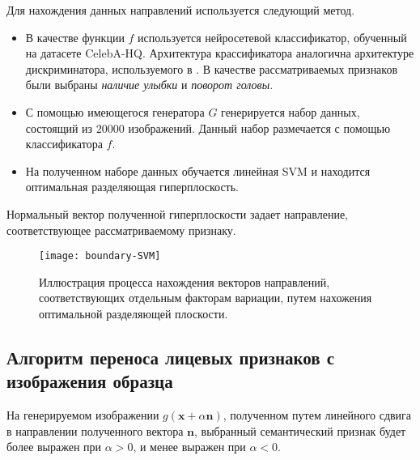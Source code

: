 Для нахождения данных направлений используется следующий метод.
\begin{itemize}
    \item В качестве функции $f$ используется нейросетевой классификатор, обученный на датасете CelebA-HQ. Архитектура крассификатора аналогична архитектуре дискриминатора, используемого в \cite{progressive-growing-gan, StyleGAN}. В качестве рассматриваемых признаков были выбраны \emph{наличие улыбки} и \emph{поворот головы}.
    \item С помощью имеющегося генератора $G$ генерируется набор данных, состоящий из $20000$ изображений. Данный набор размечается с помощью классификатора $f$.
    \item На полученном наборе данных обучается линейная SVM \cite{svm} и находится оптимальная разделяющая гиперплоскость. 
\end{itemize}
Нормальный вектор полученной гиперплоскости задает направление, соответствующее рассматриваемому признаку.

\begin{figure}[h]
\begin{center}
    \texttt{[image: boundary-SVM]}
    \caption{Иллюстрация процесса нахождения векторов направлений, соответствующих отдельным факторам вариации, путем нахожения оптимальной разделяющей плоскости.}
    \label{fig:svm-boundary}
\end{center}
\end{figure}


\subsection{Алгоритм переноса лицевых признаков с изображения образца}


На генерируемом изображении $g(\mathbf x + \alpha \mathbf n)$, полученном путем линейного сдвига в направлении полученного вектора $\mathbf n$, выбранный семантический признак будет более выражен при $\alpha > 0$, и менее выражен при $\alpha  < 0$.

